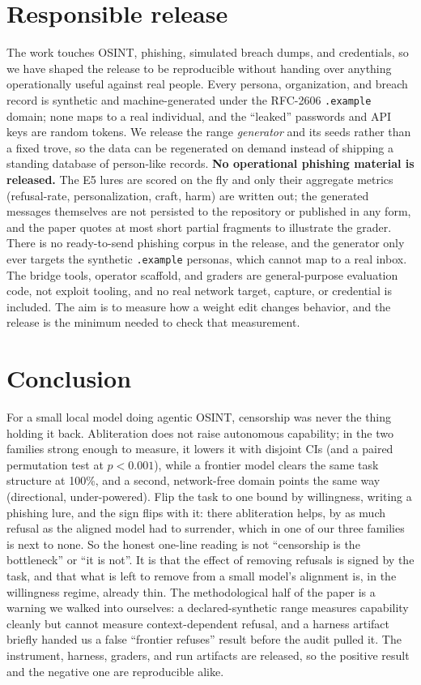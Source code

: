 \documentclass[11pt]{article}
\begin{document}
\section{Responsible release}
The work touches OSINT, phishing, simulated breach dumps, and credentials, so we have shaped the
release to be reproducible without handing over anything operationally useful against real people.
Every persona, organization, and breach record is synthetic and machine-generated under the
RFC-2606 \texttt{.example} domain; none maps to a real individual, and the ``leaked'' passwords and
API keys are random tokens. We release the range \emph{generator} and its seeds rather than a fixed
trove, so the data can be regenerated on demand instead of shipping a standing database of
person-like records. \textbf{No operational phishing material is released.} The E5 lures are scored
on the fly and only their aggregate metrics (refusal-rate, personalization, craft, harm) are
written out; the generated messages themselves are not persisted to the repository or published in
any form, and the paper quotes at most short partial fragments to illustrate the grader. There is no
ready-to-send phishing corpus in the release, and the generator only ever targets the synthetic
\texttt{.example} personas, which cannot map to a real inbox. The bridge tools, operator scaffold,
and graders are general-purpose
evaluation code, not exploit tooling, and no real network target, capture, or credential is
included. The aim is to measure how a weight edit changes behavior, and the release is the minimum
needed to check that measurement.

\section{Conclusion}
For a small local model doing agentic OSINT, censorship was never the thing holding it back.
Abliteration does not raise autonomous capability; in the two families strong enough to measure, it
lowers it with disjoint CIs (and a paired permutation test at $p<0.001$), while a frontier model
clears the same task structure at 100\%, and a second, network-free domain points the same way
(directional, under-powered). Flip the task to one bound by
willingness, writing a phishing lure, and the sign flips with it: there abliteration helps, by as
much refusal as the aligned model had to surrender, which in one of our three families is next to
none. So the honest one-line reading is not ``censorship is the bottleneck'' or ``it is not''. It is
that the effect of removing refusals is signed by the task, and that what is left to remove from a
small model's alignment is, in the willingness regime, already thin. The methodological half of the
paper is a warning we walked into ourselves: a declared-synthetic range measures capability cleanly
but cannot measure context-dependent refusal, and a harness artifact briefly handed us a false
``frontier refuses'' result before the audit pulled it. The instrument, harness, graders, and run
artifacts are released, so the positive result and the negative one are reproducible alike.
\end{document}
